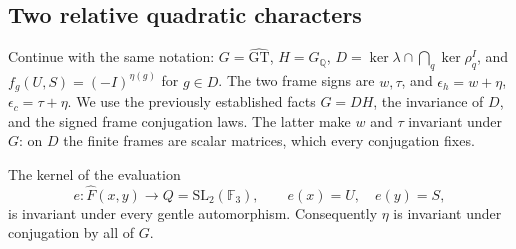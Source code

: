 \subsection{Two relative quadratic characters}

Continue with the same notation:
$G=\widehat{\mathrm{GT}}$, $H=G_{\mathbb Q}$,
$D=\ker\lambda\cap\bigcap_q\ker\rho_q^I$, and
$f_g(U,S)=(-I)^{\eta(g)}$ for $g\in D$.
The two frame signs are $w,\tau$, and
$\epsilon_h=w+\eta$, $\epsilon_c=\tau+\eta$.
We use the previously established facts $G=DH$, the invariance
of $D$, and the signed frame conjugation laws.  The latter make
$w$ and $\tau$ invariant under $G$: on $D$ the finite frames are
scalar matrices, which every conjugation fixes.

\begin{lemma}\label{lem:eta-quotient-invariant}
The kernel of the evaluation
\[
 e:\widehat F(x,y)\longrightarrow Q=\mathrm{SL}_2(\mathbb F_3),
 \qquad e(x)=U,\quad e(y)=S,
\]
is invariant under every gentle automorphism.  Consequently $\eta$
is invariant under conjugation by all of $G$.
\end{lemma}
